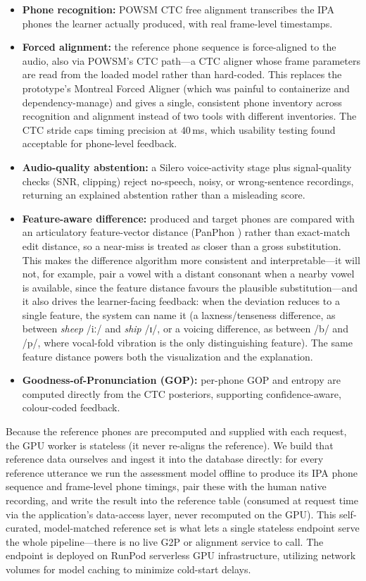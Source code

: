 \documentclass[a4paper,12pt]{report}
\newcommand{\ipa}[1]{{\ipafont #1}}
\begin{document}
\begin{itemize}
    \item \textbf{Phone recognition:} POWSM CTC free alignment transcribes the IPA phones the learner actually produced, with real frame-level timestamps.
    \item \textbf{Forced alignment:} the reference phone sequence is force-aligned to the audio, also via POWSM's CTC path---a CTC aligner whose frame parameters are read from the loaded model rather than hard-coded. This replaces the prototype's Montreal Forced Aligner (which was painful to containerize and dependency-manage) and gives a single, consistent phone inventory across recognition and alignment instead of two tools with different inventories. The CTC stride caps timing precision at $40$\,ms, which usability testing found acceptable for phone-level feedback.
    \item \textbf{Audio-quality abstention:} a Silero voice-activity stage plus signal-quality checks (SNR, clipping) reject no-speech, noisy, or wrong-sentence recordings, returning an explained abstention rather than a misleading score.
    \item \textbf{Feature-aware difference:} produced and target phones are compared with an articulatory feature-vector distance (PanPhon \cite{panphon}) rather than exact-match edit distance, so a near-miss is treated as closer than a gross substitution. This makes the difference algorithm more consistent and interpretable---it will not, for example, pair a vowel with a distant consonant when a nearby vowel is available, since the feature distance favours the plausible substitution---and it also drives the learner-facing feedback: when the deviation reduces to a single feature, the system can name it (a laxness/tenseness difference, as between \emph{sheep} \ipa{/iː/} and \emph{ship} \ipa{/ɪ/}, or a voicing difference, as between \ipa{/b/} and \ipa{/p/}, where vocal-fold vibration is the only distinguishing feature). The same feature distance powers both the visualization and the explanation.
    \item \textbf{Goodness-of-Pronunciation (GOP):} per-phone GOP and entropy are computed directly from the CTC posteriors, supporting confidence-aware, colour-coded feedback.
\end{itemize}

Because the reference phones are precomputed and supplied with each request, the GPU worker is stateless (it never re-aligns the reference). We build that reference data ourselves and ingest it into the database directly: for every reference utterance we run the assessment model offline to produce its IPA phone sequence and frame-level phone timings, pair these with the human native recording, and write the result into the reference table (consumed at request time via the application's data-access layer, never recomputed on the GPU). This self-curated, model-matched reference set is what lets a single stateless endpoint serve the whole pipeline---there is no live G2P or alignment service to call. The endpoint is deployed on RunPod serverless GPU infrastructure, utilizing network volumes for model caching to minimize cold-start delays.
\end{document}
